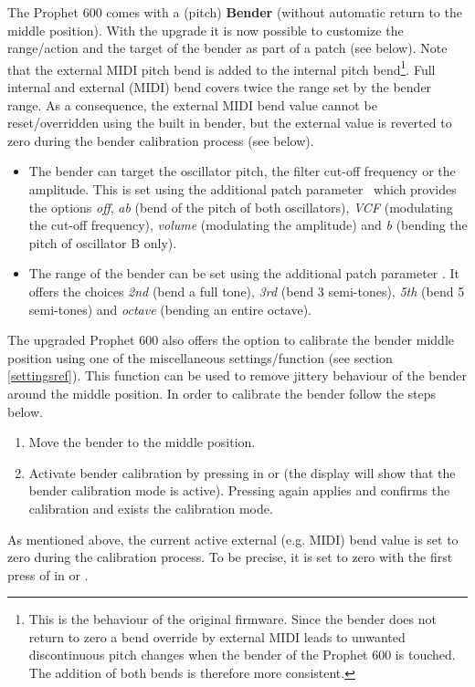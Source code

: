 The Prophet 600 comes with a (pitch) \textbf{Bender} (without automatic return to the middle position). With the upgrade it is now possible to customize the range/action and the target of the bender as part of a patch (see below). Note that the external MIDI pitch bend is added to the internal pitch bend\footnote{This is the behaviour of the original firmware. Since the bender does not return to zero a bend override by external MIDI leads to unwanted discontinuous pitch changes when the bender of the Prophet 600 is touched. The addition of both bends is therefore more consistent.}. Full internal and external (MIDI) bend covers twice the range set by the bender range. As a consequence, the external MIDI bend value cannot be reset/overridden using the built in bender, but the external value is reverted to zero during the bender calibration process (see below).

\begin{itemize}
  \item The bender can target the oscillator pitch, the filter cut-off frequency or the amplitude. This is set using the additional patch parameter \ which provides the options \textit{off}, \textit{ab} (bend of the pitch of both oscillators), \textit{VCF} (modulating the cut-off frequency), \textit{volume} (modulating the amplitude) and \textit{b} (bending the pitch of oscillator B only).
  \item The range of the bender can be set using the additional patch parameter \bendrange. It offers the choices \textit{2nd} (bend a full tone), \textit{3rd} (bend 3 semi-tones), \textit{5th} (bend 5 semi-tones) and \textit{octave} (bending an entire octave).
\end{itemize}

The upgraded Prophet 600 also offers the option to calibrate the bender middle position using one of the miscellaneous settings/function (see section \ref{settingsref}). This function can be used to remove jittery behaviour of the bender around the middle position. In order to calibrate the bender follow the steps below.

\begin{enumerate}
  \item Move the bender to the middle position.  
  \item Activate bender calibration by pressing  in \shiftmode or \shiftlock (the display will show that the bender calibration mode is active). Pressing  again applies and confirms the calibration and exists the calibration mode.
\end{enumerate}

As mentioned above, the current active external (e.g. MIDI) bend value is set to zero during the calibration process. To be precise, it is set to zero with the first press of  in \shiftmode or \shiftlock.
